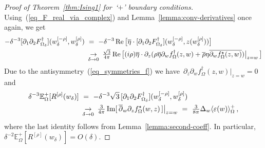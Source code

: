 \documentclass[reqno,11pt,a4paper]{amsart}
\theoremstyle{remark}
\newcommand{\Rrho}{R^{[\rho]}}
\newcommand{\E}{\mathbb{E}_\Omega}
\newcommand{\wrho}{w^{\left[\rho \right]}}
\newcommand{\wmrho}{w^{\left[-\rho \right]}}
\newcommand{\fstar}{f_{\Omega}^\star}
\newcommand{\freg}{f_{\Omega}^\dag}
\newcommand{\dOne}{\partial_1}
\newcommand{\dTwo}{\partial_2}
\renewcommand\Re{\operatorname{Re}}
\renewcommand\Im{\operatorname{Im}}
\newcommand\Corr[1]{\langle #1 \rangle}
\newcommand\CorrO[2][+]{\Corr{#2}_\Omega^{#1}}
\begin{document}
\begin{proof}[Proof of Theorem~\ref{thm:Ising1} for~`$+$' boundary conditions]
\[\]
Using~(\ref{eq_F_real_via_complex}) and Lemma~\ref{lemma:conv-derivatives} once again, we get
\begin{align*}
-\delta^{-3}[\dOne\dTwo\Fdelta^\dag](\wmrho_\delta,\wrho_\delta)~&=~ -\delta^{-3}\Re\big[\overline{\eta}\cdot[\dOne\dTwo\Fdelta^\dag](\wmrho_\delta,z(\wrho_\delta))\big]\\
&\mathop{\to}_{\delta\to 0}~\tfrac{\sqrt{3}}{4\pi}\Re\big[(i\rho)\overline{\eta}\cdot\partial_z(\rho\overline{\eta}\partial_w\freg(z,w)+ \overline{\rho}\eta\overline{\partial_w\fstar(z,w)})\big|_{z=w}\,\big]
\end{align*}
Due to the antisymmetry~(\ref{eq_symmetries_f}) we have~$\partial_z\partial_w\freg(z,w)|_{z=w}=0$ and
\begin{align}
\notag
\delta^{-3}\E^+[\Rrho(w_\delta)] ~&=~ -\delta^{-3}\sqrt{3}\,[\dOne\dTwo\Fdelta^\dag](\wmrho_\delta,\wrho_\delta)~\\
&\mathop{\to}_{\delta\to 0}~\tfrac{3}{4\pi}\Im[\,\overline{\partial}_w\partial_z\fstar(w,z)\,]\big|_{z=w}~=~\tfrac{3}{8\pi}\Delta_w\CorrO{\varepsilon(w)}\,,
\label{eq_Reta_conv}
\end{align}
where the last identity follows from Lemma~\ref{lemma:second-coeff}.
In particular, $\delta^{-2}\E^+[\Rrho(w_\delta)]=O(\delta)$.
\end{proof}
\end{document}
